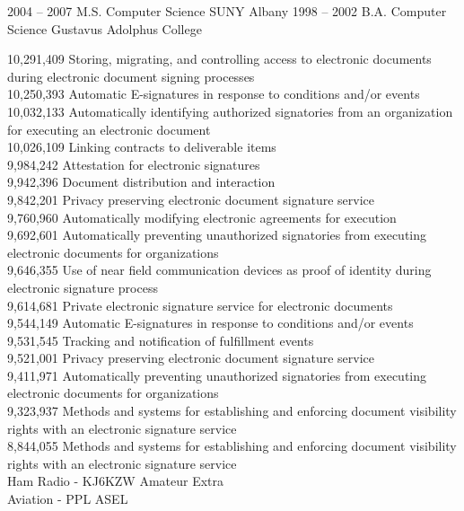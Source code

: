 \documentclass[9pt]{developercv} %
\begin{document}
\clearpage

\begin{entrylist}
	\entry
		{2004 -- 2007}
		{M.S. Computer Science}
	        {SUNY Albany}
                {}
	\entry
		{1998 -- 2002}
		{B.A. Computer Science}
	        {Gustavus Adolphus College}
                {}
\end{entrylist}


10,291,409      Storing, migrating, and controlling access to electronic documents during electronic document signing processes \\
10,250,393      Automatic E-signatures in response to conditions and/or events \\
10,032,133 	Automatically identifying authorized signatories from an organization for executing an electronic document \\
10,026,109	Linking contracts to deliverable items \\
9,984,242	Attestation for electronic signatures \\
9,942,396	Document distribution and interaction \\
9,842,201	Privacy preserving electronic document signature service \\
9,760,960	Automatically modifying electronic agreements for execution \\
9,692,601	Automatically preventing unauthorized signatories from executing electronic documents for organizations \\
9,646,355	Use of near field communication devices as proof of identity during electronic signature process \\
9,614,681	Private electronic signature service for electronic documents \\
9,544,149	Automatic E-signatures in response to conditions and/or events \\ 
9,531,545	Tracking and notification of fulfillment events \\
9,521,001	Privacy preserving electronic document signature service \\
9,411,971	Automatically preventing unauthorized signatories from executing electronic documents for organizations \\
9,323,937	Methods and systems for establishing and enforcing document visibility rights with an electronic signature service \\
8,844,055	Methods and systems for establishing and enforcing document visibility rights with an electronic signature service \\

Ham Radio - KJ6KZW Amateur Extra \\
Aviation - PPL ASEL \\


\end{document}
